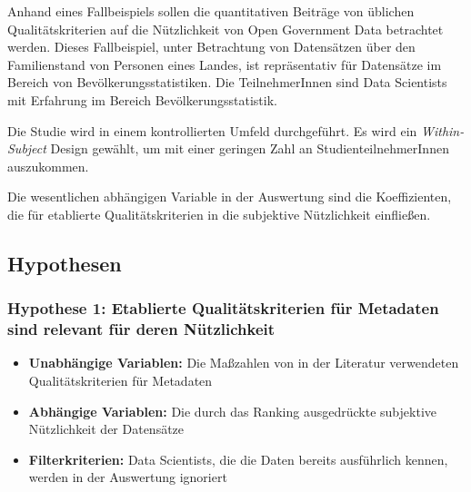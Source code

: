 \documentclass[a4paper,10pt,german,public]{INSOexpose}
\begin{document}
Anhand eines Fallbeispiels sollen die quantitativen Beiträge von
üblichen Qualitätskriterien auf die Nützlichkeit von Open Government
Data betrachtet werden.
Dieses Fallbeispiel, unter Betrachtung von Datensätzen über den Familienstand
von Personen eines Landes, ist repräsentativ für Datensätze im
Bereich von Bevölkerungsstatistiken.
Die TeilnehmerInnen sind Data Scientists mit Erfahrung im Bereich
Bevölkerungsstatistik.

Die Studie wird in einem kontrollierten Umfeld durchgeführt.
Es wird ein \emph{Within-Subject} Design gewählt, um mit einer
geringen Zahl an StudienteilnehmerInnen auszukommen.

Die wesentlichen abhängigen Variable in der Auswertung sind
die Koeffizienten, die für etablierte Qualitätskriterien in die
subjektive Nützlichkeit einfließen.

\subsection{Hypothesen}


\subsubsection{Hypothese 1: Etablierte Qualitätskriterien für Metadaten sind relevant für deren Nützlichkeit}

\begin{itemize}
    \item \textbf{Unabhängige Variablen:} Die Maßzahlen von
    in der Literatur verwendeten Qualitätskriterien für Metadaten
    \item \textbf{Abhängige Variablen:} Die durch das Ranking ausgedrückte
    subjektive Nützlichkeit der Datensätze
    \item \textbf{Filterkriterien:} Data Scientists, die die Daten
    bereits ausführlich kennen, werden in der Auswertung ignoriert
\end{itemize}
\end{document}
